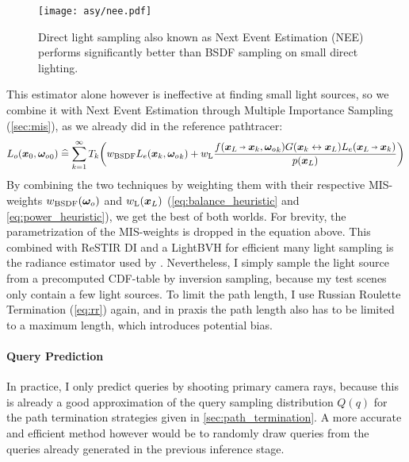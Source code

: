 \begin{figure}[htb!]
    \centering
    \texttt{[image: asy/nee.pdf]}
\caption{Direct light sampling also known as Next Event Estimation (NEE) performs significantly better than BSDF sampling on small direct lighting.}
\label{fig:nee}
\end{figure}
This estimator alone however is ineffective at finding small light sources, so we combine it with Next Event Estimation through Multiple Importance Sampling (\cref{sec:mis}), as we already did in the reference pathtracer:
\begin{equation}
\begin{aligned}
    L_o(\vec{x}_0, \wo_0)
    \hateq \sum_{k=1}^{\infty} T_k \left( w_\text{BSDF} L_e(\x_k, \wo_k) + w_\text{L} \frac{f(\pdir{L}{k}, \wo_k) \G{k}{L} L_e(\pdir{L}{k})}{p(\x_L)} \right)
\end{aligned}
\end{equation}
By combining the two techniques by weighting them with their respective MIS-weights $w_\text{BSDF}({\bm{\omega}_o})$ and $w_\text{L}(\bm{x}_L)$ (\cref{eq:balance_heuristic} and \cref{eq:power_heuristic}), we get the best of both worlds.
For brevity, the parametrization of the MIS-weights is dropped in the equation above.
This combined with ReSTIR DI \parencite{bitterli2020} and a LightBVH \parencite{moreau2019} for efficient many light sampling is the radiance estimator used by \textcite{muller2021}.
Nevertheless, I simply sample the light source from a precomputed CDF-table by inversion sampling, because my test scenes only contain a few light sources.
To limit the path length, I use Russian Roulette Termination (\cref{eq:rr}) again, and in praxis the path length also has to be limited to a maximum length, which introduces potential bias.

\paragraph{Query Prediction}
In practice, I only predict queries by shooting primary camera rays, because this is already a good approximation of the query sampling distribution $Q(q)$ for the path termination strategies given in \cref{sec:path_termination}.
A more accurate and efficient method however would be to randomly draw queries from the queries already generated in the previous inference stage.

